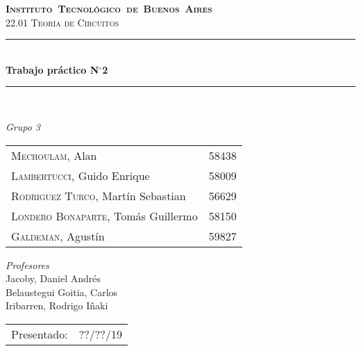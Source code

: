 \begin{titlepage}
\newcommand{\HRule}{\rule{\linewidth}{0.5mm}}
\center
\mbox{\textsc{\LARGE \bfseries {Instituto Tecnológico de Buenos Aires}}}\\[1.5cm]
\textsc{\Large 22.01 Teoría de Circuitos}\\[0.5cm]


\HRule \\[0.6cm]
{ \Huge \bfseries Trabajo práctico N$^{\circ}$2}\\[0.4cm] 
\HRule \\[1.5cm]


{\large

\emph{Grupo 3}\\
\vspace{3px}

\begin{tabular}{lr} 	
\textsc{Mechoulam}, Alan  &  58438\\
\textsc{Lambertucci}, Guido Enrique  & 58009 \\
\textsc{Rodriguez Turco}, Martín Sebastian  & 56629 \\
\textsc{Londero Bonaparte}, Tomás Guillermo  & 58150 \\
\textsc{Galdeman}, Agustín & 59827\\
\end{tabular}

\vspace{20px}

\emph{Profesores}\\
Jacoby, Daniel Andrés\\
Belaustegui Goitia, Carlos\\
Iribarren, Rodrigo Iñaki\\
\vspace{3px}

\vspace{100px}

\begin{tabular}{ll}

Presentado: & ??/??/19\\

\end{tabular}

}

\vfill

\end{titlepage}
